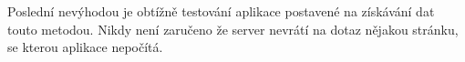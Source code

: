 Poslední nevýhodou je obtížně testování aplikace postavené na získávání dat touto metodou. Nikdy není zaručeno že server nevrátí na dotaz nějakou stránku, se kterou aplikace nepočítá.





